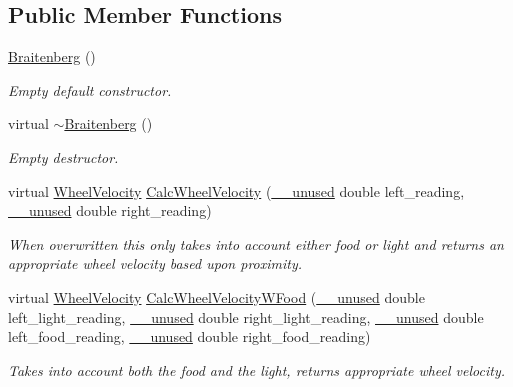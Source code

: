 \subsection*{Public Member Functions}
\begin{DoxyCompactItemize}
\item 
\mbox{\label{class_braitenberg_a4ee23d8db33e23db109f7f29164d8a23}} 
\mbox{\hyperlink{class_braitenberg_a4ee23d8db33e23db109f7f29164d8a23}{Braitenberg}} ()
\begin{DoxyCompactList}\small\item\em Empty default constructor. \end{DoxyCompactList}\item 
\mbox{\label{class_braitenberg_acd0c15e660bb9d94f6dac077b61cf189}} 
virtual \mbox{\hyperlink{class_braitenberg_acd0c15e660bb9d94f6dac077b61cf189}{$\sim$\+Braitenberg}} ()
\begin{DoxyCompactList}\small\item\em Empty destructor. \end{DoxyCompactList}\item 
\mbox{\label{class_braitenberg_a46af2879438ad5e946f771239f84c308}} 
virtual \mbox{\hyperlink{struct_wheel_velocity}{Wheel\+Velocity}} \mbox{\hyperlink{class_braitenberg_a46af2879438ad5e946f771239f84c308}{Calc\+Wheel\+Velocity}} (\mbox{\hyperlink{common_8h_a2e3484535ee610c8e19e9859563abe48}{\+\_\+\+\_\+unused}} double left\+\_\+reading, \mbox{\hyperlink{common_8h_a2e3484535ee610c8e19e9859563abe48}{\+\_\+\+\_\+unused}} double right\+\_\+reading)
\begin{DoxyCompactList}\small\item\em When overwritten this only takes into account either food or light and returns an appropriate wheel velocity based upon proximity. \end{DoxyCompactList}\item 
\mbox{\label{class_braitenberg_af79ef8be83a527368586513773cbd095}} 
virtual \mbox{\hyperlink{struct_wheel_velocity}{Wheel\+Velocity}} \mbox{\hyperlink{class_braitenberg_af79ef8be83a527368586513773cbd095}{Calc\+Wheel\+Velocity\+W\+Food}} (\mbox{\hyperlink{common_8h_a2e3484535ee610c8e19e9859563abe48}{\+\_\+\+\_\+unused}} double left\+\_\+light\+\_\+reading, \mbox{\hyperlink{common_8h_a2e3484535ee610c8e19e9859563abe48}{\+\_\+\+\_\+unused}} double right\+\_\+light\+\_\+reading, \mbox{\hyperlink{common_8h_a2e3484535ee610c8e19e9859563abe48}{\+\_\+\+\_\+unused}} double left\+\_\+food\+\_\+reading, \mbox{\hyperlink{common_8h_a2e3484535ee610c8e19e9859563abe48}{\+\_\+\+\_\+unused}} double right\+\_\+food\+\_\+reading)
\begin{DoxyCompactList}\small\item\em Takes into account both the food and the light, returns appropriate wheel velocity. \end{DoxyCompactList}\end{DoxyCompactItemize}


